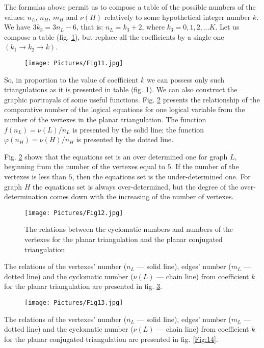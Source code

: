 \documentclass{amsart}
\theoremstyle{plain}
\numberwithin{equation}{section}
\begin{document}
The formulas above permit us to compose a table of the possible numbers of the values: $n_L$, $n_H$, $m_H$ and $\nu(H)$ relatively to some hypothetical integer number $k$. We have $3k_3=3n_L-6$, that is: $n_L=k_3+2$, where $k_3=0,1,2,...K$. Let us compose a table (fig. \ref {Fig:11}), but replace all the coefficients by a single one $(k_1\rightarrow k_2\rightarrow k)$.

\begin{figure}[htb]
		\texttt{[image: Pictures/Fig11.jpg]}
	\caption{}
	\label{Fig:11}
\end{figure}

So, in proportion to the value of coefficient $k$ we can possess only such triangulations as it is presented in table (fig. \ref{Fig:11}). We can also construct the graphic portrayals of some useful functions. Fig. \ref {Fig:12} presents the relationship of the comparative number of the logical equations for one logical variable from the number of the vertexes in the planar triangulation. The function $f(n_L )=\nu(L)/n_L$ is presented by the solid line; the function $\varphi(n_H)=\nu(H)/n_H$ is presented by the dotted line. 

Fig. \ref {Fig:12} shows that the equations set is an over determined one for graph $L$, beginning from the number of the vertexes equal to $5$. If the number of the vertexes is less than $5$, then the equations set is the under-determined one. For graph $H$ the equations set is always over-determined, but the degree of the over-determination comes down with the increasing of the number of vertexes.

\begin{figure}[htb]
		\texttt{[image: Pictures/Fig12.jpg]}
	\caption{The relations between the cyclomatic numbers and numbers of the vertexes for the planar triangulation and the planar conjugated triangulation}
	\label{Fig:12}
\end{figure}

The relations of the vertexes' number ($n_L$ --- solid line), edges' number ($m_L$ --- dotted line) and the cyclomatic number ($\nu(L)$ --- chain line) from coefficient $k$ for the planar triangulation are presented in fig. \ref{Fig:13}. 

\begin{figure}[htb]
	\texttt{[image: Pictures/Fig13.jpg]}
	\caption{}
	\label{Fig:13}
\end{figure}

The relations of the vertexes' number ($n_L$ --- solid line), edges' number ($m_L$ --- dotted line) and the cyclomatic number ($\nu(L)$ --- chain line) from coefficient $k$ for the planar conjugated triangulation are presented in fig. \ref {Fig:14}.
\end{document}
